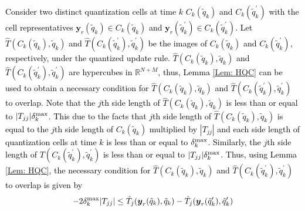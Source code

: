 \documentclass[10pt,twocolumn,twoside]{IEEEtran}
\begin{document}
\begin{IEEEproof}
\textcolor{black}{Consider two distinct quantization cells at time $k$ $C_k{\left({\tilde{q}_k}\right)}$ and $C_k{\left({\tilde{q}^\prime_k}\right)}$ with the cell representatives ${\ensuremath{\boldsymbol{{y}}}}_r{\left({\tilde{q}_k}\right)}\in C_k{\left({\tilde{q}_k}\right)}$ and ${\ensuremath{\boldsymbol{{y}}}}_r{\left({\tilde{q}^\prime_k}\right)}\in C_k{\left({\tilde{q}^\prime_k}\right)}$. Let ${\ensuremath{\hat{T}\left({C_k{\left({\tilde{q}_k}\right)}},{\tilde{q}_k}\right)}}$ and ${\ensuremath{\hat{T}\left({C_k{\left({\tilde{q}_k^\prime}\right)}},{\tilde{q}_k^\prime}\right)}}$ be the images of $C_k{\left({\tilde{q}_k}\right)}$ and $C_k{\left({\tilde{q}_k^\prime}\right)}$, respectively,  under the quantized update rule. ${\ensuremath{\hat{T}\left({C_k{\left({\tilde{q}_k}\right)}},{\tilde{q}_k}\right)}}$ and ${\ensuremath{\hat{T}\left({C_k{\left({\tilde{q}_k^\prime}\right)}},{\tilde{q}_k^\prime}\right)}}$ are hypercubes in ${\ensuremath{{\ensuremath{\mathbb{{R}}}}}}^{N+M}$, thus, Lemma \ref{Lem: HQC} can be used to obtain a necessary condition for ${\ensuremath{\hat{T}\left({C_k{\left({\tilde{q}_k}\right)}},{\tilde{q}_k}\right)}}$ and ${\ensuremath{\hat{T}\left({C_k{\left({\tilde{q}_k^\prime}\right)}},{\tilde{q}_k^\prime}\right)}}$ to overlap. Note that the $j$th side length of ${\ensuremath{\hat{T}\left({C_k{\left({\tilde{q}_k}\right)}},{\tilde{q}_k}\right)}}$ is less than or equal to ${\left|{T_{jj}}\right|}\delta^{\rm max}_k$. This due to the facts that $j$th side length of ${\ensuremath{\hat{T}\left({C_k{\left({\tilde{q}_k}\right)}},{\tilde{q}_k}\right)}}$ is equal to the $j$th side length of $C_k{\left({\tilde{q}_k}\right)}$ multiplied by ${\left|{T_{jj}}\right|}$ and each side length of quantization cells at time $k$ is less than or equal to $\delta^{\rm max}_k$. Similarly, the $j$th side length of $T{\left({C_k{\left({\tilde{q}^\prime_k}\right)},\tilde{q}^\prime_k}\right)}$ is less than or equal to ${\left|{T_{jj}}\right|}\delta^{\rm max}_k$. 
Thus, using Lemma \ref{Lem: HQC}, the necessary condition for ${\ensuremath{\hat{T}\left({C_k{\left({\tilde{q}_k}\right)}},{\tilde{q}_k}\right)}}$ and ${\ensuremath{\hat{T}\left({C_k{\left({\tilde{q}^\prime_k}\right)}},{\tilde{q}^\prime_k}\right)}}$ to overlap is given by 
\begin{align}\label{Eq: ini-nec-con}
-2\delta^{\rm max}_k{\left|{T_{jj}}\right|}\leq\hat{T}_j{\left({{\ensuremath{\boldsymbol{{y}}}}_r{\left({\tilde{q}_k}\right)},\tilde{q}_k}\right)}&-\hat{T}_j{\left({{\ensuremath{\boldsymbol{{y}}}}_r{\left({\tilde{q}^\prime_k}\right)},\tilde{q}^\prime_k}\right)}\nonumber\\

\end{align}}
\end{IEEEproof}
\end{document}
